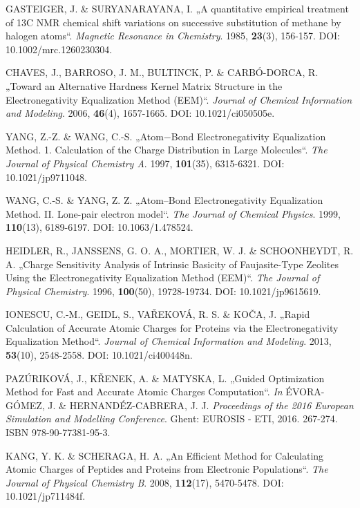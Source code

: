 \begin{thebibliography}{10}
GASTEIGER, J. \& SURYANARAYANA, I. „A quantitative empirical treatment of 13C NMR chemical shift variations on successive substitution of methane by halogen atoms“. \textit{Magnetic Resonance in Chemistry}. 1985, \textbf{23}(3), 156-157. DOI: 10.1002/mrc.1260230304. 

CHAVES, J., BARROSO, J. M., BULTINCK, P. \& CARBÓ-DORCA, R. „Toward an Alternative Hardness Kernel Matrix Structure in the Electronegativity Equalization Method (EEM)“. \textit{Journal of Chemical Information and Modeling}. 2006, \textbf{46}(4), 1657-1665. DOI: 10.1021/ci050505e.

YANG, Z.-Z. \& WANG, C.-S. „Atom−Bond Electronegativity Equalization Method. 1. Calculation of the Charge Distribution in Large Molecules“. \textit{The Journal of Physical Chemistry A}. 1997, \textbf{101}(35), 6315-6321. DOI: 10.1021/jp9711048. 

WANG, C.-S. \& YANG, Z. Z. „Atom–Bond Electronegativity Equalization Method. II. Lone-pair electron model“. \textit{The Journal of Chemical Physics}. 1999, \textbf{110}(13), 6189-6197. DOI: 10.1063/1.478524.

HEIDLER, R., JANSSENS, G. O. A., MORTIER, W. J. \& SCHOONHEYDT, R. A. „Charge Sensitivity Analysis of Intrinsic Basicity of Faujasite-Type Zeolites Using the Electronegativity Equalization Method (EEM)“. \textit{The Journal of Physical Chemistry}. 1996, \textbf{100}(50), 19728-19734. DOI: 10.1021/jp9615619.

IONESCU, C.-M., GEIDL, S., VAŘEKOVÁ, R. S. \& KOČA, J. „Rapid Calculation of Accurate Atomic Charges for Proteins via the Electronegativity Equalization Method“. \textit{Journal of Chemical Information and Modeling}. 2013, \textbf{53}(10), 2548-2558. DOI: 10.1021/ci400448n.

PAZÚRIKOVÁ, J., KŘENEK, A. \& MATYSKA, L. „Guided Optimization Method for Fast and Accurate Atomic Charges Computation“. \textit{In} ÉVORA-GÓMEZ, J. \& HERNANDÉZ-CABRERA, J. J. \textit{Proceedings of the 2016 European Simulation and Modelling Conference}. Ghent: EUROSIS - ETI, 2016. 267-274. ISBN 978-90-77381-95-3.

KANG, Y. K. \& SCHERAGA, H. A. „An Efficient Method for Calculating Atomic Charges of Peptides and Proteins from Electronic Populations“. \textit{The Journal of Physical Chemistry B}. 2008, \textbf{112}(17), 5470-5478. DOI: 10.1021/jp711484f.


\end{thebibliography}
